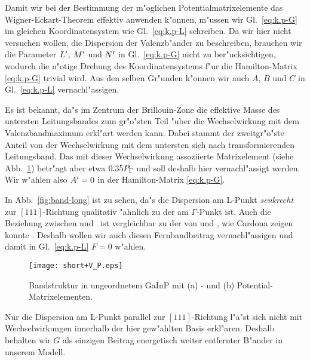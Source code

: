 Damit wir bei der Bestimmung der m"oglichen Potentialmatrixelemente das
Wigner-Eckart-Theorem effektiv anwenden k"onnen, m"ussen wir
Gl.~\eqref{eq:k.p-G} im gleichen Koordinatensystem wie Gl.~\eqref{eq:k.p-L}
schreiben. Da wir hier nicht versuchen wollen, die Dispersion der
Valenzb"ander zu beschreiben, brauchen wir die Parameter $L^{\prime}$, $M^{\prime}$
und $N^{\prime}$ in Gl.~\eqref{eq:k.p-G} nicht zu ber"ucksichtigen, wodurch die
n"otige Drehung des Koordinatensystems f"ur die Hamilton-Matrix
\eqref{eq:k.p-G} trivial wird. Aus den selben Gr"unden k"onnen wir auch $A$,
$B$ und $C$ in Gl.~\eqref{eq:k.p-L} vernachl"assigen. 

Es ist bekannt, da"s im Zentrum der Brillouin-Zone die effektive Masse des
untersten Leitungsbandes zum gr"o"sten Teil "uber die Wechselwirkung mit dem
Valenzbandmaximum erkl"art werden kann. Dabei stammt der zweitgr"o"ste Anteil
von der Wechselwirkung mit dem untersten sich nach  transformierenden
Leitungsband. Das mit dieser Wechselwirkung assoziierte Matrixelement
\pri{\PG} (siehe Abb.~\ref{fig:short+V_P}) betr"agt aber etwa $0.35 P_{\Gamma}$
\cite{ccf:88} und soll deshalb hier vernachl"assigt werden. Wir w"ahlen also
$A^{\prime}=0$ in der Hamilton-Matrix \eqref{eq:k.p-G}.

In Abb.~\ref{fig:band-long} ist zu sehen, da"s die Dispersion am L-Punkt
\emph{senkrecht} zur $[111]$-Richtung qualitativ "ahnlich zu der am
$\Gamma$-Punkt ist. Auch die Beziehung zwischen \pri{\PL} und \PL\ ist
vergleichbar zu der von \pri{\PG} und \PG, wie Cardona zeigen konnte
\cite{card:63}. Deshalb wollen wir auch diesen Fernbandbeitrag
vernachl"assigen und damit in Gl.~\eqref{eq:k.p-L} $F=0$ w"ahlen.

\renewcommand{\bottomfraction}{0.7}
%
\begin{figure}[hb]
  \texttt{[image: short+V\_P.eps]}
  \caption{Bandstruktur in  ungeordnetem GaInP mit (a) \kdotp- und (b)
      Potential-Matrixelementen.} 
  \label{fig:short+V_P}
\end{figure}
%

Nur die Dispersion am L-Punkt parallel zur $[111]$-Richtung l"a"st sich nicht
mit Wechselwirkungen innerhalb der hier gew"ahlten Basis erkl"aren. Deshalb
behalten wir $G$ als einzigen Beitrag energetisch weiter entfernter B"ander in
unserem Modell.

